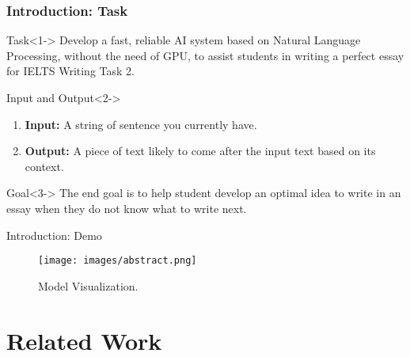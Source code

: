 \documentclass[10pt]{beamer}
\begin{document}

\begin{frame}
\frametitle{Introduction: Task}

\begin{block}{Task}<1->
    Develop a fast, reliable AI system based on Natural Language Processing, without the need of GPU, to assist students in writing a perfect essay for IELTS Writing Task 2.
\end{block}

\begin{exampleblock}{Input and Output}<2->
\begin{enumerate}
    \item \textbf{Input: } A string of sentence you currently have.
    \item \textbf{Output: } A piece of text likely to come after the input text based on its context.
\end{enumerate}
\end{exampleblock}

\begin{block}{Goal}<3->
    The end goal is to help student develop an optimal idea to write in an essay when they do not know what to write next.
\end{block}
\end{frame}



\begin{frame}{Introduction: Demo}

\begin{figure}
\texttt{[image: images/abstract.png]}
\caption{Model Visualization.}
\label{table:IELTS Academic mean performance}
\end{figure}

    
\end{frame}


\section{Related Work} %
\end{document}
